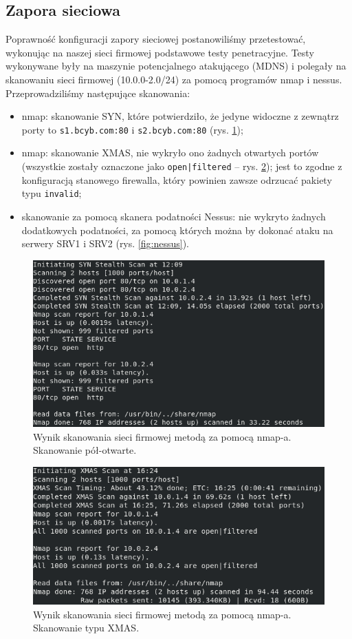 \documentclass{eiti-raport}
\begin{document}
\subsection{Zapora sieciowa} \label{sec:testy-firewall}
Poprawność konfiguracji zapory sieciowej postanowiliśmy przetestować, wykonując na naszej sieci firmowej podstawowe testy penetracyjne. Testy wykonywane były na maszynie potencjalnego atakującego (MDNS) i polegały na skanowaniu sieci firmowej (10.0.0-2.0/24) za pomocą programów nmap i nessus. Przeprowadziliśmy następujące skanowania:
\begin{itemize}
	\item nmap: skanowanie SYN, które potwierdziło, że jedyne widoczne z zewnątrz porty to \texttt{s1.bcyb.com:80} i \texttt{s2.bcyb.com:80} (rys. \ref{fig:nmap});
	\item nmap: skanowanie XMAS, nie wykryło ono żadnych otwartych portów (wszystkie zostały oznaczone jako \texttt{open|filtered} -- rys. \ref{fig:nmap-xmas}); jest to zgodne z konfiguracją stanowego firewalla, który powinien zawsze odrzucać pakiety typu \texttt{invalid}; 
	\item skanowanie za pomocą skanera podatności Nessus: nie wykryto żadnych dodatkowych podatności, za pomocą których można by dokonać ataku na serwery SRV1 i SRV2 (rys. \ref{fig:nessus}).
\end{itemize}

\begin{figure}[!h] \centering
	\includegraphics[width=0.95\linewidth]{img/nmap.PNG}
	\caption{Wynik skanowania sieci firmowej metodą za pomocą nmap-a. Skanowanie pół-otwarte.} \label{fig:nmap}
\end{figure}

\begin{figure}[!h] \centering
	\includegraphics[width=0.95\linewidth]{img/nmap-xmas.PNG}
	\caption{Wynik skanowania sieci firmowej metodą za pomocą nmap-a. Skanowanie typu XMAS.} \label{fig:nmap-xmas}
\end{figure}
\end{document}
